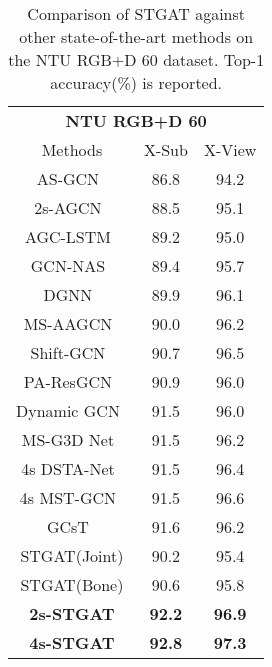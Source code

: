 \documentclass[runningheads]{llncs}
\begin{document}
  \begin{table}[t]   
      \centering
      \begin{tabular}{ccc} 
      \hline
      \multicolumn{3}{c}{\textbf{NTU RGB+D 60}} \\
      Methods & X-Sub & X-View  \\
      \hline
AS-GCN~\cite{li2019actional} & 86.8 & 94.2\\
      2s-AGCN~\cite{shi2019two} &  88.5 & 95.1\\
      AGC-LSTM~\cite{si2019attention} &  89.2 & 95.0\\
      GCN-NAS~\cite{peng2020learning} & 89.4 & 95.7 \\
      DGNN~\cite{shi2019skeleton1} &  89.9 & 96.1\\
      MS-AAGCN~\cite{shi2019skeleton} & 90.0 & 96.2\\
      Shift-GCN~\cite{cheng2020skeleton} & 90.7 & 96.5 \\
PA-ResGCN~\cite{song2020stronger} & 90.9 & 96.0 \\
      Dynamic GCN~\cite{ye2020dynamic} & 91.5 & 96.0 \\
      MS-G3D Net~\cite{liu2020disentangling}& 91.5 & 96.2 \\
      4s DSTA-Net~\cite{shi2020decoupled} & 91.5 & 96.4 \\
      4s MST-GCN~\cite{chen2021multi} &91.5 & 96.6 \\
      GCsT~\cite{bai2021gcst}  &  91.6 & 96.2 \\
      \hline
      STGAT(Joint) & 90.2 &  95.4 \\
      STGAT(Bone) & 90.6 &  95.8\\
      \textbf{2s-STGAT} & \textbf{92.2} &  \textbf{96.9} \\  
      \textbf{4s-STGAT} & \textbf{92.8} &  \textbf{97.3} \\   
      \hline
      \end{tabular}    
      \caption{Comparison of STGAT against other state-of-the-art methods on the NTU RGB+D 60 dataset. Top-1 accuracy(\%) is reported.} 
      \label{table5}
      \vspace{-25px}
      \end{table}
 
\end{document}

